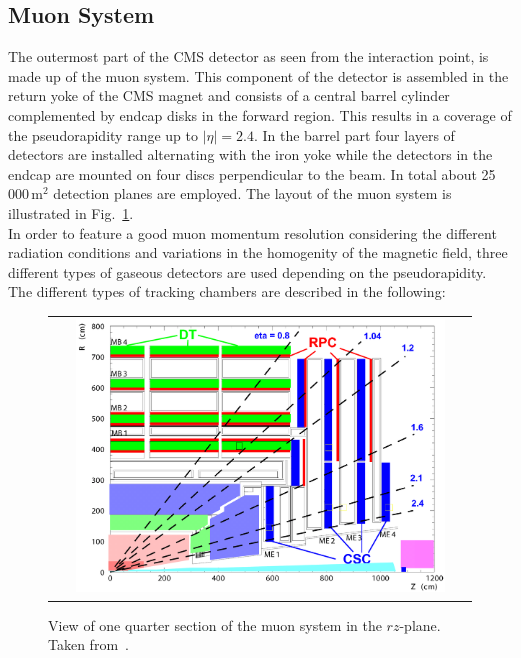 \subsection{Muon System}
\label{subsec:cms_muon}
The outermost part of the CMS detector as seen from the interaction point, is made up of the muon system. This component of the detector is assembled in the return yoke of the CMS magnet and consists of a central barrel cylinder complemented by endcap disks in the forward region. This results in a coverage of the pseudorapidity range up to $|\eta| = 2.4$. In the barrel part four layers of detectors are installed alternating with the iron yoke while the detectors in the endcap are mounted on four discs perpendicular to the beam. In total about 25\,000\,$\mathrm{m}^2$ detection planes are employed. The layout of the muon system is illustrated in Fig.~\ref{fig:CMS_muon}. \\
In order to feature a good muon momentum resolution considering the different radiation conditions and variations in the homogenity of the magnetic field, three different types of gaseous detectors are used depending on the pseudorapidity. The different types of tracking chambers are described in the following:
\begin{figure}[!tp]
  \centering
  \begin{tabular}{c}
    \includegraphics[width=0.9\textwidth]{figures/Figures_Experimental_Apparatus_MuonDetector.png}
  \end{tabular}
  \caption{View of one quarter section of the muon system in the $rz$-plane. Taken from~\cite{bib:cmsptdr1}.}
  \label{fig:CMS_muon}
\end{figure}

